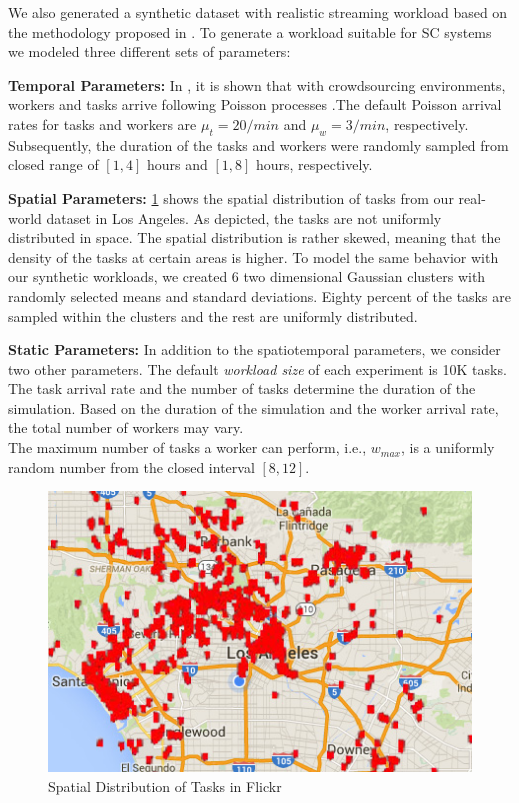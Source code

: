 We also generated a synthetic dataset with realistic streaming workload based on the methodology proposed in \cite{Tang07}. To generate a workload suitable for SC systems we modeled three different sets of parameters:

\noindent \textbf{Temporal Parameters:} In \cite{Basu15}, it is shown that with crowdsourcing environments, workers and tasks arrive following Poisson processes \cite{Stoyan87}.The default Poisson arrival rates for tasks and workers are $\mu_t = 20/min$ and $\mu_w = 3/min$, respectively. Subsequently, the duration of the tasks and workers were randomly sampled from closed range of $\left[1,4 \right]$ hours and $\left[1,8 \right]$ hours, respectively.

\noindent \textbf{Spatial Parameters:} \cref{fig:la_flickr} shows the spatial distribution of tasks from our real-world dataset in Los Angeles. As depicted, the tasks are not uniformly distributed in space. The spatial distribution is rather skewed, meaning that the density of the tasks at certain areas is higher. To model the same behavior with our synthetic workloads, we created 6 two dimensional Gaussian clusters with randomly selected means and standard deviations. Eighty percent of the tasks are sampled within the clusters and the rest are uniformly distributed.

\noindent \textbf{Static Parameters:} In addition to the spatiotemporal parameters, we consider two other parameters. The default \emph{workload size} of each experiment is 10K tasks. The task arrival rate and the number of tasks determine the duration of the simulation. Based on the duration of the simulation and the worker arrival rate, the total number of workers may vary.\\
The maximum number of tasks a worker can perform, i.e., $w_{max}$, is a uniformly random number from the closed interval $\left[8,12 \right]$.

\begin{figure}[h]
	\centering
	\includegraphics[scale=0.35]{figures/la_flickr.jpg}
	\caption{Spatial Distribution of Tasks in Flickr}\label{fig:la_flickr}
\end{figure}

